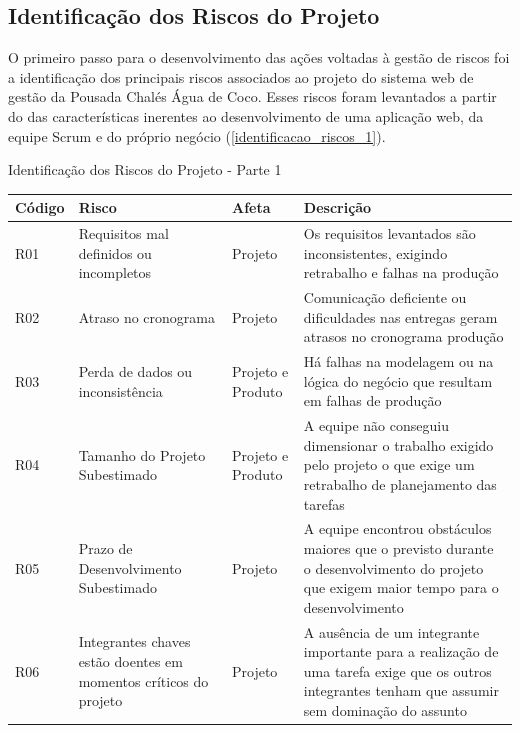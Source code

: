 \documentclass[
	12pt,				%
	openany,			%
	oneside,			%
	a4paper,			%
	english,			%
	french,				%
	spanish,			%
	brazil				%
	]{abntex2}
\begin{document}
\subsection{Identificação dos Riscos do Projeto}
O primeiro passo para o desenvolvimento das ações voltadas à gestão de riscos foi a identificação dos principais riscos associados ao projeto do sistema web de gestão da Pousada Chalés Água de Coco. Esses riscos foram levantados a partir do das características inerentes ao desenvolvimento de uma aplicação web, da equipe Scrum e do próprio negócio (\autoref{identificacao_riscos_1}).
\\
% 
\begin{quadro}[H]
	\caption{Identificação dos Riscos do Projeto - Parte 1} \label{identificacao_riscos_1} 
	\begin{tabular}{|>{\centering\arraybackslash}p{2cm}|>{\centering\arraybackslash}p{5cm}|>{\centering\arraybackslash}p{3cm}|p{4.2cm}|}
		\hline
		\textbf{Código} & \textbf{Risco} & \textbf{Afeta} & \textbf{Descrição}  \\
		\hline
		R01 & Requisitos mal definidos ou incompletos &
		Projeto  & Os requisitos levantados são inconsistentes, exigindo retrabalho e falhas na produção \\
		\hline
		R02 & Atraso no cronograma &
		Projeto  & Comunicação deficiente ou dificuldades nas entregas geram atrasos no cronograma produção \\
		\hline
		R03 & Perda de dados ou inconsistência &
		Projeto e \newline Produto  & Há falhas na modelagem ou na lógica do negócio que resultam em falhas de produção \\ \hline
		R04 & Tamanho do Projeto Subestimado &
		Projeto e Produto  & A equipe não conseguiu dimensionar o trabalho exigido pelo projeto o que exige um retrabalho de planejamento das tarefas \\
		\hline
		R05 & Prazo de Desenvolvimento Subestimado &
		Projeto & A equipe encontrou obstáculos maiores que o previsto durante o desenvolvimento do projeto que exigem maior tempo para o desenvolvimento \\
		\hline
		R06 & 	Integrantes chaves estão doentes em momentos críticos do projeto & Projeto & A ausência de um integrante importante para a realização de uma tarefa exige que os outros integrantes tenham que assumir sem dominação do assunto \\
		\hline
	\end{tabular}
\end{quadro}		
\end{document}
